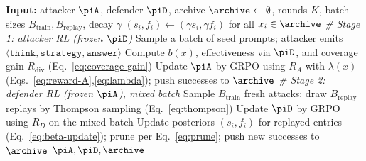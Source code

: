 \begin{algorithm}[t]
  \caption{\method training loop (simplified)}
  \label{alg:dace-short}
  \begin{algorithmic}[1]
    \State \textbf{Input:} attacker $\piA$, defender $\piD$, archive $\archive\leftarrow\emptyset$, rounds $K$, batch sizes $B_{\mathrm{train}},B_{\mathrm{replay}}$, decay $\gamma$
      \State $(s_i,f_i)\leftarrow(\gamma s_i,\gamma f_i)$ for all $x_i\in\archive$ 
      \Statex \hspace*{-1.2em}\textit{\small \# Stage 1: attacker RL (frozen $\piD$)}
      \State Sample a batch of seed prompts; attacker emits $\langle\texttt{think},\texttt{strategy},\texttt{answer}\rangle$
      \State Compute $b(x)$, effectiveness via $\piD$, and coverage gain $R_{\mathrm{div}}$ (Eq.~\ref{eq:coverage-gain})
      \State Update $\piA$ by GRPO using $R_A$ with $\lambda(x)$ (Eqs.~\ref{eq:reward-A},\ref{eq:lambda}); push successes to $\archive$
      \Statex \hspace*{-1.2em}\textit{\small \# Stage 2: defender RL (frozen $\piA$), mixed batch}
      \State Sample $B_{\mathrm{train}}$ fresh attacks; draw $B_{\mathrm{replay}}$ replays by Thompson sampling (Eq.~\ref{eq:thompson})
      \State Update $\piD$ by GRPO using $R_D$ on the mixed batch
      \State Update posteriors $(s_i,f_i)$ for replayed entries (Eq.~\ref{eq:beta-update}); prune per Eq.~\ref{eq:prune}; push new successes to $\archive$
    \EndFor
    \State \Return $\piA,\piD,\archive$
  \end{algorithmic}
\end{algorithm}
